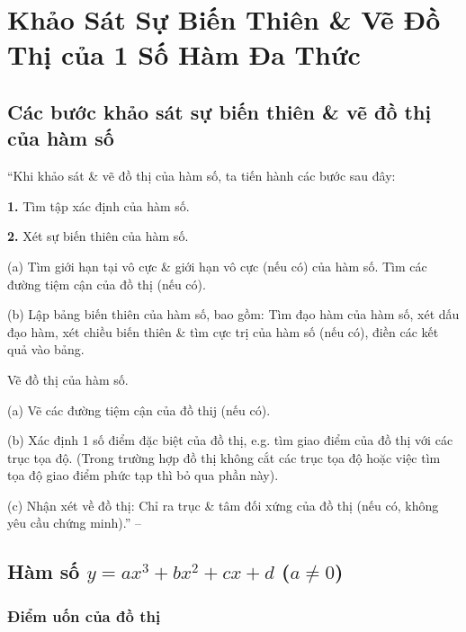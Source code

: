 \documentclass[oneside]{book}
\numberwithin{equation}{section}
\begin{document}
\section{Khảo Sát Sự Biến Thiên \& Vẽ Đồ Thị của 1 Số Hàm Đa Thức}

\subsection{Các bước khảo sát sự biến thiên \& vẽ đồ thị của hàm số}
``Khi khảo sát \& vẽ đồ thị của hàm số, ta tiến hành các bước sau đây:
\begin{enumerate*}
	\item[\textbf{1.}] Tìm tập xác định của hàm số.
	\item[\textbf{2.}] Xét sự biến thiên của hàm số.
	\begin{enumerate*}
		\item[(a)] Tìm giới hạn tại vô cực \& giới hạn vô cực (nếu có) của hàm số. Tìm các đường tiệm cận của đồ thị (nếu có).
		\item[(b)] Lập bảng biến thiên của hàm số, bao gồm: Tìm đạo hàm của hàm số, xét dấu đạo hàm, xét chiều biến thiên \& tìm cực trị của hàm số (nếu có), điền các kết quả vào bảng.
	\end{enumerate*}
	\item Vẽ đồ thị của hàm số.
	\begin{enumerate*}
		\item[(a)] Vẽ các đường tiệm cận của đồ thij (nếu có).
		\item[(b)] Xác định 1 số điểm đặc biệt của đồ thị, e.g. tìm giao điểm của đồ thị với các trục tọa độ. (Trong trường hợp đồ thị không cắt các trục tọa độ hoặc việc tìm tọa độ giao điểm phức tạp thì bỏ qua phần này).
		\item[(c)] Nhận xét về đồ thị: Chỉ ra trục \& tâm đối xứng của đồ thị (nếu có, không yêu cầu chứng minh).'' -- \cite[p. 37]{SGK_Toan_12_giai_tich_nang_cao}
	\end{enumerate*}
\end{enumerate*}

\subsection{Hàm số $y = ax^3 + bx^2 + cx + d$ ($a\ne 0$)}

\subsubsection{Điểm uốn của đồ thị}
\end{document}
